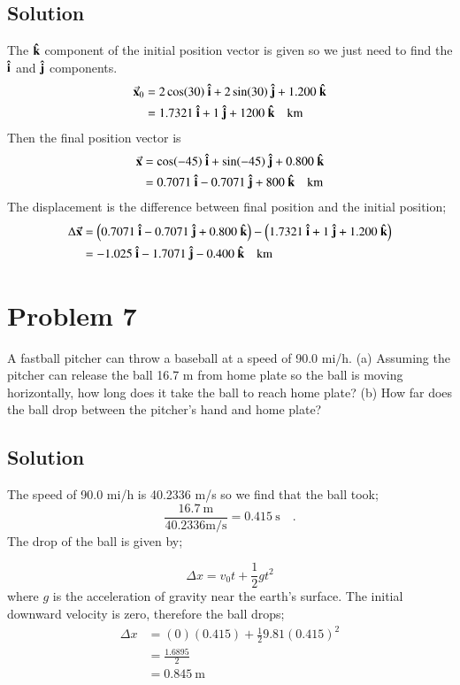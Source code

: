 \documentclass{article}
\begin{document}
\subsection*{Solution}
The $\vu k$ component of the initial position vector is given so we just need to find the $\vu i$ and $\vu j$ components.
\begin{align*}
	\va x_0 &= 2\cos(30)\ \vu i + 2\sin(30)\ \vu j + 1.200\ \vu k \\
		&= 1.7321\ \vu i + 1\ \vu j + 1200\ \vu k \quad \text{km}
\end{align*}
Then the final position vector is
\begin{align*}
	\va x &= \cos(-45)\ \vu i + \sin(-45)\ \vu j + 0.800\ \vu k \\
	      &= 0.7071\ \vu i -0.7071\ \vu j + 800\ \vu k \quad \text{km}
\end{align*}
The displacement is the difference between final position and the initial position;
\begin{align*}
	\Delta \va x &= \left(0.7071\ \vu i -0.7071\ \vu j + 0.800\ \vu k \right) - \left( 1.7321\ \vu i + 1\ \vu j + 1.200\ \vu k \right) \\
		     &= -1.025\ \vu  i - 1.7071\ \vu j -0.400\ \vu k \quad \text{km}
\end{align*}

\section*{Problem 7}
A fastball pitcher can throw a baseball at a speed of 90.0 mi/h.
(a) Assuming the pitcher can release the ball 16.7 m from home plate so the ball is moving horizontally, how long does it take
the ball to reach home plate?
(b) How far does the ball drop between the pitcher’s hand and home plate?

\subsection*{Solution}
The speed of 90.0 mi/h is 40.2336 m/s so we find that the ball took;
\[
	\frac{16.7\ \text{m}}{40.2336 \text{m/s}} = 0.415\ \text{s} \quad .
\]
The drop of the ball is given by;

\begin{equation}
	\Delta x =  v_0 t + \frac{1}{2}gt^2
\end{equation}
where $g$ is the acceleration of gravity near the earth's surface. The initial downward velocity is zero, therefore the ball drops;
\begin{align*}
	\Delta x &= (0)(0.415) + \frac{1}{2}9.81(0.415)^2 \\
		 &= \frac{1.6895}{2} \\
		 &= 0.845\ \text{m}
\end{align*}
\end{document}
